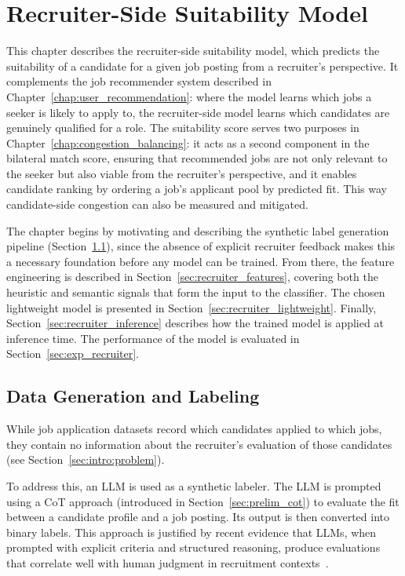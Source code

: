 \chapter{Recruiter-Side Suitability Model}
\label{chap:recruiter_recommendation}

This chapter describes the recruiter-side suitability model, which predicts the suitability of a candidate for a given job posting from a recruiter's perspective. It complements the job recommender system described in Chapter~\ref{chap:user_recommendation}: where the model learns which jobs a seeker is likely to apply to, the recruiter-side model learns which candidates are genuinely qualified for a role. The suitability score serves two purposes in Chapter~\ref{chap:congestion_balancing}: it acts as a second component in the bilateral match score, ensuring that recommended jobs are not only relevant to the seeker but also viable from the recruiter's perspective, and it enables candidate ranking by ordering a job's applicant pool by predicted fit. This way candidate-side congestion can also be measured and mitigated.

The chapter begins by motivating and describing the synthetic label generation pipeline (Section~\ref{sec:recruiter_data_gen}), since the absence of explicit recruiter feedback makes this a necessary foundation before any model can be trained. From there, the feature engineering is described in Section~\ref{sec:recruiter_features}, covering both the heuristic and semantic signals that form the input to the classifier. The chosen lightweight model is presented in Section~\ref{sec:recruiter_lightweight}.  Finally, Section~\ref{sec:recruiter_inference} describes how the trained model is applied at inference time. The performance of the model is evaluated in Section~\ref{sec:exp_recruiter}.

\section{Data Generation and Labeling}
\label{sec:recruiter_data_gen}

While job application datasets record which candidates applied to which 
jobs, they contain no information about the recruiter's evaluation of 
those candidates (see Section~\ref{sec:intro:problem}). 
 
To address this, an \gls{LLM} is used as a synthetic labeler. The \gls{LLM} is prompted using a \gls{CoT} approach (introduced in Section~\ref{sec:prelim_cot}) to evaluate the fit between a candidate profile and a job posting. Its output is then converted into binary labels. This approach is justified by recent evidence that \glspl{LLM}, when prompted with explicit criteria and structured reasoning, produce evaluations that correlate well with human judgment in recruitment contexts~\cite{wei2023chainofthoughtpromptingelicitsreasoning}.

